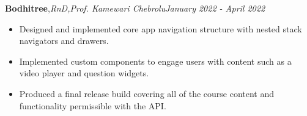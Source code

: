 \textbf{Bodhitree}\sep{\it RnD\sep Prof. Kamewari Chebrolu}\hfill{\sl \small January 2022 - April 2022}\\
\vspace{-8pt}
\begin{itemize}[itemsep = -1.7 mm, leftmargin=*]
\item Designed and implemented core app navigation structure with nested stack navigators and drawers.
\item Implemented custom components to engage users with content such as a video player and question widgets.
\item Produced a final release build covering all of the course content and functionality permissible with the API.
\end{itemize}
